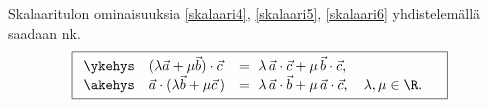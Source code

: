 Skalaaritulon ominaisuuksia \eqref{skalaari4}, \eqref{skalaari5}, \eqref{skalaari6} 
yhdistelemällä saadaan nk.\
%
\begin{equation} \label{skalaari7}
\boxed{\begin{array}{ll}
\ykehys \quad (\lambda \vec a + \mu \vec b) \cdot \vec c 
                    &= \ \lambda\,\vec a \cdot \vec c + \mu\,\vec b \cdot \vec c, \\ 
\akehys \quad\vec a \cdot (\lambda \vec b + \mu \vec c\,)  
                    &= \ \lambda\,\vec a \cdot \vec b + \mu\,\vec a \cdot \vec c,
                                                    \quad \lambda,\mu \in \R. \quad
\end{array}}
\end{equation} 

